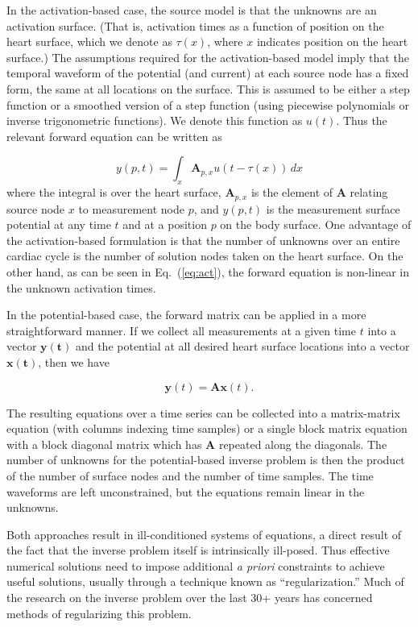 \documentclass[fleqn,11pt,openany]{book}
\begin{document}
In the activation-based case, the source model is that the unknowns are an
activation surface. (That is, activation times as a function of position on
the heart surface, which we denote as $\tau(x)$, where $x$ indicates
position on the heart surface.)
The assumptions required for the activation-based model imply that the temporal waveform of the potential
(and current) at each source node has a fixed form, the same at all
locations on the surface.
This is assumed to be either a step function or a smoothed version of a step function (using
piecewise polynomials or inverse trigonometric functions). We denote this
function as $u(t)$. Thus the relevant forward equation can be written as

\begin{equation} y(p,t) = \int_{x} \mathbf{A}_{p,x}u(t-\tau(x))\,dx \label{eq:act}
\end{equation}
%
\noindent where the integral is over the heart surface, $\mathbf{A}_{p,x}$ is the
element of $\mathbf{A}$ relating source node $x$ to measurement node $p$,
and $y(p,t)$ is the measurement surface potential at any time $t$ and at a
position $p$ on the body surface. One advantage of the activation-based
formulation is that the number of unknowns over an entire cardiac cycle is
the number of solution nodes taken on the heart surface. On the other hand,
as can be seen in Eq.~(\ref{eq:act}), the forward equation is non-linear in
the unknown activation times.

In the potential-based case, the forward matrix can be applied in a more
straightforward manner. If we collect all measurements at a given time $t$ into
a vector $\mathbf{y(t)}$ and the potential at all desired heart surface locations
into a vector $\mathbf{x(t)}$, then we have

\begin{equation} \mathbf{y}(t) = \mathbf{A}\mathbf{x}(t).\label{eq:TransMat}
\end{equation}

The resulting equations over a time series can be collected into a
matrix-matrix equation (with columns indexing time samples) or a single
block matrix equation with a block diagonal matrix which has $\mathbf{A}$
repeated along the diagonals. The number of unknowns for the potential-based
inverse problem is then the product of the number of surface nodes and the
number of time samples. The time waveforms are left unconstrained, but
the equations remain linear in the unknowns.

Both approaches result in ill-conditioned systems of equations, a direct
result of the fact that the inverse problem itself is intrinsically
ill-posed. Thus effective numerical solutions need to impose additional
\textit{a priori} constraints to achieve useful solutions, usually through
a technique known as ``regularization.'' Much of the research on the
inverse problem over the last 30+ years has concerned methods of
regularizing this problem.
\end{document}
